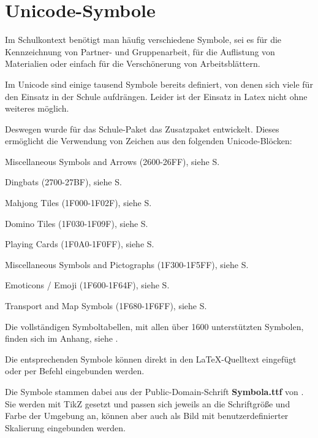 \section{Unicode-Symbole}
\label{paket:utfsym}

Im Schulkontext benötigt man häufig verschiedene Symbole, sei es
für die Kennzeichnung von Partner- und Gruppenarbeit, für die
Auflistung von Materialien oder einfach für die Verschönerung
von Arbeitsblättern.

Im Unicode sind einige tausend Symbole bereits definiert, von
denen sich viele für den Einsatz in der Schule aufdrängen. 
Leider ist der Einsatz in Latex nicht ohne weiteres möglich.

Deswegen wurde für das Schule-Paket das Zusatzpaket 
entwickelt. Dieses ermöglicht die Verwendung von Zeichen aus
den folgenden Unicode-Blöcken:

\begin{smallitemize}
	\item Miscellaneous Symbols and Arrows (2600-26FF),
		siehe S.~\pageref{utab:02600-026FF}
	\item Dingbats (2700-27BF),
		siehe S.~\pageref{utab:02700-027BF}
	\item Mahjong Tiles (1F000-1F02F),
		siehe S.~\pageref{utab:1F000-1F02F}
	\item Domino Tiles (1F030-1F09F),
		siehe S.~\pageref{utab:1F030-1F09F}
	\item Playing Cards (1F0A0-1F0FF),
		siehe S.~\pageref{utab:1F0A0-1F0FF}
	\item Miscellaneous Symbols and Pictographs (1F300-1F5FF),
		siehe S.~\pageref{utab:1F300-1F5FF}
	\item Emoticons / Emoji (1F600-1F64F),
		siehe S.~\pageref{utab:1F600-1F64F}
	\item Transport and Map Symbols (1F680-1F6FF),
		siehe S.~\pageref{utab:1F680-1F6FF}
\end{smallitemize}

Die vollständigen Symboltabellen, mit
allen über 1600 unterstützten Symbolen, finden sich im Anhang, siehe
.

Die entsprechenden Symbole können direkt in den LaTeX-Quelltext
eingefügt oder per Befehl eingebunden werden.

Die Symbole stammen dabei aus der Public-Domain-Schrift
\textbf{Symbola.ttf} von . Sie werden mit
TikZ gesetzt und passen sich jeweils an die Schriftgröße und
Farbe der Umgebung an, können aber auch als Bild mit
benutzerdefinierter Skalierung eingebunden werden.

